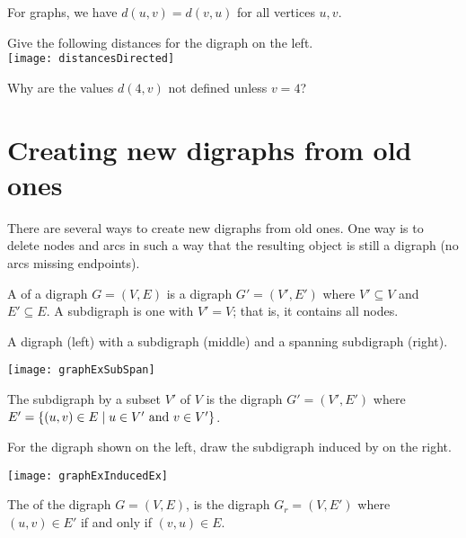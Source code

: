 For graphs, we have $d(u,v) = d(v,u)$ for all vertices $u, v$. 

\begin{Boxample}[2]
Give the following distances for the digraph on the left.\\
\newline
\texttt{[image: distancesDirected]}
\newline

Why are the values $d(4, v)$ not defined unless $v = 4$?
\end{Boxample}

\section{Creating new digraphs from old ones}
There are several ways to create new digraphs from old ones.
One way is to delete nodes and arcs in such a way that the 
resulting object is still a digraph (no arcs missing endpoints).

\begin{Definition}
A  of a digraph $G = (V, E)$ is a digraph $G' = (V', E')$ 
where $V'\subseteq V$ and $E'\subseteq E$. 
A  subdigraph is one with $V' = V$; that is, it contains all nodes.
\end{Definition}

\begin{Boxample}
A digraph (left) with a subdigraph (middle) and a spanning subdigraph (right).
\begin{center}
\texttt{[image: graphExSubSpan]} 
\end{center}
\end{Boxample}

\begin{Definition}
The subdigraph  by a subset $V'$ of $V$ is the digraph
$G' = (V', E')$ where $E' = \mbox{$\{(u, v) \in E \mid u \in V' \mbox{ and } v\in V'\}$}$.
\end{Definition}

\begin{Boxample}
For the digraph shown on the left, draw the subdigraph induced by   on the right.
\begin{center}
\texttt{[image: graphExInducedEx]}
\end{center}
\end{Boxample}

\begin{Definition}
The  of the digraph $G = (V, E)$, is the digraph $G_r = (V, E')$ where $(u, v)\in E'$ if and only if $(v, u)\in E$.
\end{Definition}

